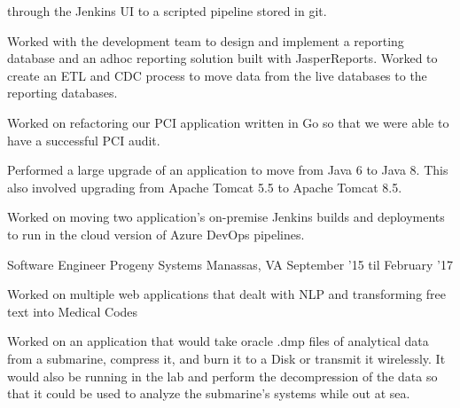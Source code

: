 \begin{cventries}
{\begin{cvitems}
{            through the Jenkins UI to a scripted pipeline stored in git.}
        \item {Worked with the development team to design and implement a reporting database and an adhoc reporting solution built with JasperReports.
            Worked to create an ETL and CDC process to move data from the live databases to the reporting databases.}
        \item {Worked on refactoring our PCI application written in Go so that we were able to have a successful PCI audit.}
        \item {Performed a large upgrade of an application to move from Java 6 to Java 8. This also involved upgrading from Apache Tomcat 5.5 to Apache Tomcat 8.5.}
        \item {Worked on moving two application's on-premise Jenkins builds and deployments to run in the cloud version of Azure DevOps pipelines.}
        \end{cvitems}
    }

    \cventry
    {Software Engineer} %
    {Progeny Systems} %
    {Manassas, VA} %
    {September '15 til February '17} %
    {
        \begin{cvitems} %
        \item {Worked on multiple web applications that dealt with NLP and transforming free text into Medical Codes}
        \item {Worked on an application that would take oracle .dmp files of analytical data from a submarine,
            compress it, and burn it to a Disk or transmit it wirelessly. It would also be running in the lab 
            and perform the decompression of the data so that it could be used to analyze the submarine's systems while out at sea.}
        \end{cvitems}
    }
\end{cventries}
